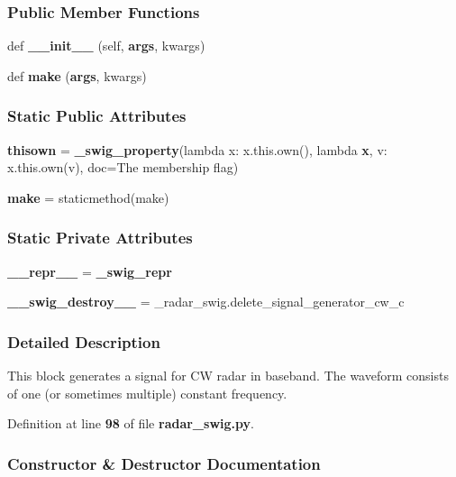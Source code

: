 \subsubsection*{Public Member Functions}
\begin{DoxyCompactItemize}
\item 
def {\bf \+\_\+\+\_\+init\+\_\+\+\_\+} (self, {\bf args}, kwargs)
\item 
def {\bf make} ({\bf args}, kwargs)
\end{DoxyCompactItemize}
\subsubsection*{Static Public Attributes}
\begin{DoxyCompactItemize}
\item 
{\bf thisown} = {\bf \+\_\+swig\+\_\+property}(lambda x\+: x.\+this.\+own(), lambda {\bf x}, v\+: x.\+this.\+own(v), doc=\textquotesingle{}The membership flag\textquotesingle{})
\item 
{\bf make} = staticmethod(make)
\end{DoxyCompactItemize}
\subsubsection*{Static Private Attributes}
\begin{DoxyCompactItemize}
\item 
{\bf \+\_\+\+\_\+repr\+\_\+\+\_\+} = {\bf \+\_\+swig\+\_\+repr}
\item 
{\bf \+\_\+\+\_\+swig\+\_\+destroy\+\_\+\+\_\+} = \+\_\+radar\+\_\+swig.\+delete\+\_\+signal\+\_\+generator\+\_\+cw\+\_\+c
\end{DoxyCompactItemize}


\subsubsection{Detailed Description}
\begin{DoxyVerb}This block generates a signal for CW radar in baseband. The waveform consists of one (or sometimes multiple) constant frequency.\end{DoxyVerb}
 

Definition at line {\bf 98} of file {\bf radar\+\_\+swig.\+py}.



\subsubsection{Constructor \& Destructor Documentation}
